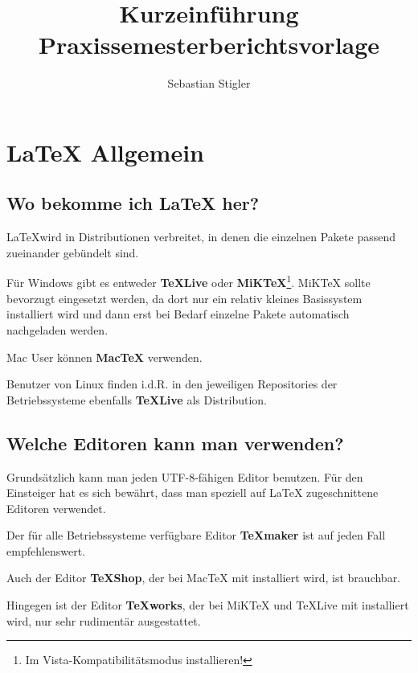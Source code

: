 \documentclass[pdftex,a4paper]{scrartcl}
\title{Kurzeinführung Praxissemesterberichtsvorlage}
\author{Sebastian Stigler}
\begin{document}
\maketitle

\tableofcontents

\section{\LaTeX{} Allgemein}

\subsection{Wo bekomme ich \LaTeX{} her?}
\LaTeX wird in Distributionen verbreitet, in denen die einzelnen Pakete passend zueinander gebündelt sind.

Für Windows gibt es entweder \textbf{\TeX{}Live}\autocite{tug:texlive} oder \textbf{MiK\TeX}\footnote{Im Vista-Kompatibilitätsmodus installieren!}\autocite{schenk:miktex}.
MiK\TeX{} sollte bevorzugt eingesetzt werden, da dort nur ein relativ kleines Basissystem installiert wird und dann erst bei Bedarf einzelne Pakete automatisch nachgeladen werden.

Mac User können \textbf{Mac\TeX}\autocite{tug:mactex} verwenden.

Benutzer von Linux finden i.d.R. in den jeweiligen Repositories der Betriebssysteme ebenfalls \textbf{\TeX{}Live}\autocite{tug:texlive} als Distribution.

\subsection{Welche Editoren kann man verwenden?}

Grundsätzlich kann man jeden UTF-8-fähigen Editor benutzen. Für den Einsteiger hat es sich bewährt, dass man speziell auf \LaTeX{} zugeschnittene Editoren verwendet.

Der für alle Betriebssysteme verfügbare Editor \textbf{\TeX{}maker}\autocite{brachet:texmaker} ist auf jeden Fall empfehlenswert.

Auch der Editor \textbf{\TeX{}Shop}, der bei Mac\TeX{} mit installiert wird, ist brauchbar.

Hingegen ist der Editor \textbf{\TeX{}works}, der bei MiK\TeX{} und \TeX{}Live mit installiert wird, nur sehr rudimentär ausgestattet.

\end{document}
